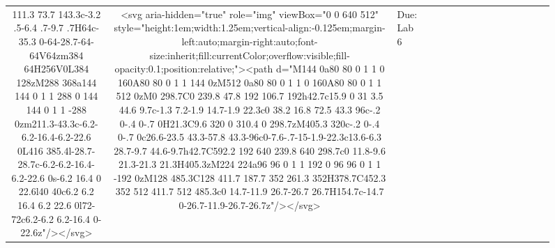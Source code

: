 \documentclass[
]{article}
\begin{document}
\begin{figure*}
\begin{longtable*}{cclllccccccccccl}
111.3 73.7 143.3c-3.2 .5-6.4 .7-9.7 .7H64c-35.3 0-64-28.7-64-64V64zm384 64H256V0L384 128zM288 368a144 144 0 1 1 288 0 144 144 0 1 1 -288 0zm211.3-43.3c-6.2-6.2-16.4-6.2-22.6 0L416 385.4l-28.7-28.7c-6.2-6.2-16.4-6.2-22.6 0s-6.2 16.4 0 22.6l40 40c6.2 6.2 16.4 6.2 22.6 0l72-72c6.2-6.2 6.2-16.4 0-22.6z"/></svg> & <svg aria-hidden="true" role="img" viewBox="0 0 640 512" style="height:1em;width:1.25em;vertical-align:-0.125em;margin-left:auto;margin-right:auto;font-size:inherit;fill:currentColor;overflow:visible;fill-opacity:0.1;position:relative;"><path d="M144 0a80 80 0 1 1 0 160A80 80 0 1 1 144 0zM512 0a80 80 0 1 1 0 160A80 80 0 1 1 512 0zM0 298.7C0 239.8 47.8 192 106.7 192h42.7c15.9 0 31 3.5 44.6 9.7c-1.3 7.2-1.9 14.7-1.9 22.3c0 38.2 16.8 72.5 43.3 96c-.2 0-.4 0-.7 0H21.3C9.6 320 0 310.4 0 298.7zM405.3 320c-.2 0-.4 0-.7 0c26.6-23.5 43.3-57.8 43.3-96c0-7.6-.7-15-1.9-22.3c13.6-6.3 28.7-9.7 44.6-9.7h42.7C592.2 192 640 239.8 640 298.7c0 11.8-9.6 21.3-21.3 21.3H405.3zM224 224a96 96 0 1 1 192 0 96 96 0 1 1 -192 0zM128 485.3C128 411.7 187.7 352 261.3 352H378.7C452.3 352 512 411.7 512 485.3c0 14.7-11.9 26.7-26.7 26.7H154.7c-14.7 0-26.7-11.9-26.7-26.7z"/></svg> & Due: Lab 6 \\ 

\end{longtable*}
\end{figure*}
\end{document}
